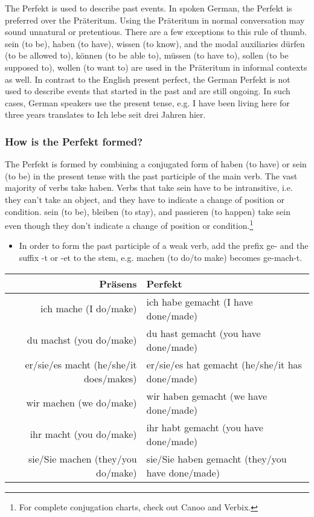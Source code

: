 The Perfekt is used to describe past events. In spoken German, the Perfekt is preferred over the Pr{\"a}teritum. Using the Pr{\"a}teritum in normal conversation may sound unnatural or pretentious.  There are a few exceptions to this rule of thumb. sein (to be), haben (to have), wissen (to know), and the modal auxiliaries d{\"u}rfen (to be allowed to), k{\"o}nnen (to be able to), m{\"u}ssen (to have to), sollen (to be supposed to), wollen (to want to) are used in the Pr{\"a}teritum in informal contexts as well.  In contrast to the English present perfect, the German Perfekt is not used to describe events that started in the past and are still ongoing. In such cases, German speakers use the present tense, e.g. I have been living here for three years translates to Ich lebe seit drei Jahren hier.

\subsubsection{How is the Perfekt formed?}

The Perfekt is formed by combining a conjugated form of haben (to have) or sein (to be) in the present tense with the past participle of the main verb.  The vast majority of verbs take haben. Verbs that take sein have to be intransitive, i.e. they can't take an object, and they have to indicate a change of position or condition. sein (to be), bleiben (to stay), and passieren (to happen) take sein even though they don't indicate a change of position or condition.\footnote{For complete conjugation charts, check out Canoo and Verbix.}

\begin{itemize}
  \item  In order to form the past participle of a weak verb, add the prefix ge- and the suffix -t or -et to the stem, e.g. machen (to do/to make) becomes ge-mach-t.
\end{itemize}

\begin{center}\begin{tabular}{r|l}
  \textbf{Pr{\"a}sens} & \textbf{Perfekt} \\
	\hline
	ich mache (I do/make) & ich habe gemacht (I have done/made) \\
	du machst (you do/make) & du hast gemacht (you have done/made) \\
	er/sie/es macht (he/she/it does/makes) & er/sie/es hat gemacht (he/she/it has done/made) \\
	wir machen (we do/make) & wir haben gemacht (we have done/made) \\
	ihr macht (you do/make) & ihr habt gemacht (you have done/made) \\
	sie/Sie machen (they/you do/make) & sie/Sie haben gemacht (they/you have done/made) \\
\end{tabular}\end{center}

